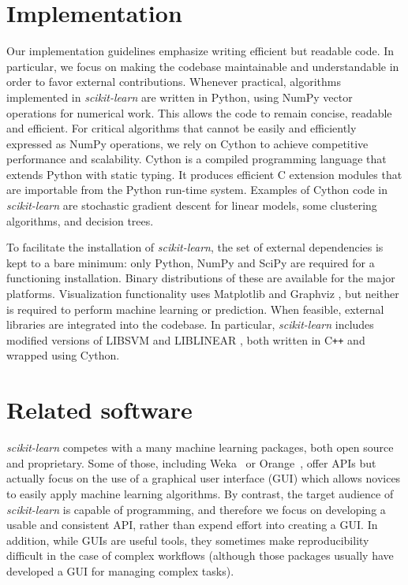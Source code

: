 \documentclass[twocolumn]{article}
\newcommand{\sklearn}{\textit{scikit-learn}\xspace}
\begin{document}
\section{Implementation}
\label{sec:implementation}

Our implementation guidelines emphasize writing efficient but readable code.
In particular, we focus on making the codebase maintainable and
understandable in order to favor external contributions. Whenever practical,
algorithms implemented in \sklearn are written in Python,
using NumPy vector operations for numerical work.
This allows the code to remain concise, readable and efficient.
For critical algorithms that cannot be easily and efficiently
expressed as NumPy operations, we rely on Cython \citep{behnel2011cython}
to achieve competitive performance and scalability. Cython is a
compiled programming language that extends Python with static typing. It
produces efficient C extension modules that are importable from the
Python run-time system. Examples of Cython code in \sklearn are
stochastic gradient descent for linear models, some clustering
algorithms, and decision trees.

To facilitate the installation of \sklearn,
the set of external dependencies is kept to a bare minimum:
only Python, NumPy and SciPy are required for a functioning installation.
Binary distributions of these are available for the major platforms.
Visualization functionality uses Matplotlib \citep{hunter2007matplotlib}
and Graphviz \citep{gansner2000},
but neither is required to perform machine learning or prediction.
When feasible, external libraries are integrated into the codebase.
In particular, \sklearn includes modified versions of \textsf{LIBSVM} and \textsf{LIBLINEAR}
\citep{chang2011libsvm,fan2008}, both written in C{}\verb!++!
and wrapped using Cython.

\section{Related software}
\label{sec:comparison}

\sklearn competes with a many machine learning packages,
both open source and proprietary.
Some of those, including Weka~\citep{hall2009weka} or
Orange~\citep{Demsar2004}, offer APIs but actually focus on the use of a graphical user interface (GUI)
which allows novices to easily apply machine learning algorithms. By
contrast, the target audience of \sklearn is capable of programming, and
therefore we focus on developing a usable and consistent API, rather than expend
effort into creating a GUI\@. In addition, while GUIs are useful tools, they
sometimes make reproducibility difficult in the case of complex workflows
(although those packages usually have developed a GUI for managing complex
tasks).
\end{document}
